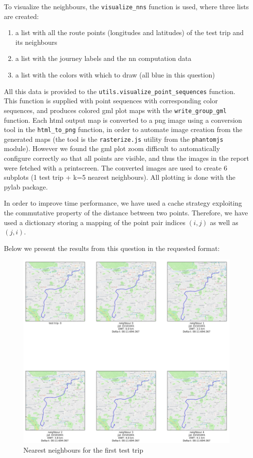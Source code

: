\documentclass[12pt]{article}
\begin{document}
	
  To visualize the neighbours, the \texttt{visualize\_nns}
  function is used, where three lists are created:
  \begin{enumerate}
    \item a list with all the route points (longitudes and latitudes) of the
      test trip and its neighbours
    \item a list with the journey labels and the nn computation data
      \item a list with the colors with which to draw (all blue in this
        question)
      \end{enumerate}
      All this data is provided to the
      \texttt{utils.visualize\_point\_sequences} function. This function is
      supplied with point sequences with corresponding color sequences, and
      produces colored gml plot maps with the \texttt{write\_group\_gml}
      function. Each html output map is converted to a png image using a conversion tool in the \texttt{html\_to\_png} function, in
order to automate image creation from the generated maps (the tool is the
\texttt{rasterize.js} utility from the \texttt{phantomjs} module).
However we found the gml plot zoom difficult to automatically configure correctly so that all points are visible, and thus the images in the report were fetched with a printscreen. The converted images are used to create 6 subplots (1 test trip + k=5 nearest neighbours). All plotting is done with the pylab package.

In order to improve time performance, we have used a cache strategy exploiting the commutative property of the distance between two points. Therefore, we have used a dictionary storing a mapping of the point pair indices $(i,j)$ as well as $(j,i)$.

	Below we present the results from this question in the requested format:
	
	\begin{figure} [H]
		\begin{center}
			\includegraphics [scale = 0.60] {nn1.png}
			\caption{Nearest neighbours for the first test trip}
		\end{center}
	\end{figure} 
\end{document}

